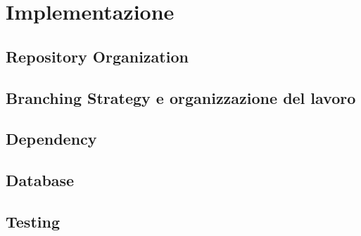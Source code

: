 \chapter{Implementazione}

\section{Repository Organization}

\section{Branching Strategy e organizzazione del lavoro}

\section{Dependency}

\section{Database}

\section{Testing}